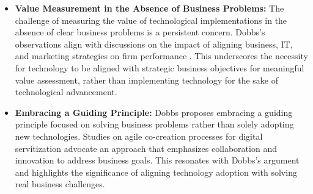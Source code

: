 \documentclass[a4Paper]{article}
\begin{document}
\begin{itemize}
    \item \textbf{Value Measurement in the Absence of Business Problems:} The challenge of measuring the value of technological implementations in the absence of clear business problems is a persistent concern. Dobbs's observations align with discussions on the impact of aligning business, IT, and marketing strategies on firm performance \cite{al2020impact}. This underscores the necessity for technology to be aligned with strategic business objectives for meaningful value assessment, rather than implementing technology for the sake of technological advancement.
    
    \item \textbf{Embracing a Guiding Principle:} Dobbs proposes embracing a guiding principle focused on solving business problems rather than solely adopting new technologies. Studies on agile co-creation processes for digital servitization \cite{sjodin2020agile} advocate an approach that emphasizes collaboration and innovation to address business goals. This resonates with Dobbs's argument and highlights the significance of aligning technology adoption with solving real business challenges.
\end{itemize}
\end{document}
